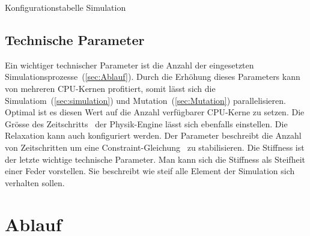     \begin{table}[H]
      
      \caption{Konfigurationstabelle Simulation\label{tbl:simulation-parameters-general}}
    \end{table}

    \subsection{Technische Parameter}
      Ein wichtiger technischer Parameter ist die Anzahl der eingesetzten Simulationsprozesse~(\vref{sec:Ablauf}).
      Durch die Erhöhung dieses Parameters kann von mehreren CPU-Kernen profitiert, somit lässt sich die Simulatiom~(\vref{sec:simulation}) und Mutation~(\vref{sec:Mutation}) parallelisieren.
      Optimal ist es diesen Wert auf die Anzahl verfügbarer CPU-Kerne zu setzen.
      Die Grösse des Zeitschritts~\cite{bullet:steppingTheWorld} der Physik-Engine lässt sich ebenfalls einstellen.
      Die Relaxation kann auch konfiguriert werden. Der Parameter beschreibt die Anzahl von Zeitschritten um eine Constraint-Gleichung~\cite{gamedev:constraints} zu stabilisieren.
      Die Stiffness ist der letzte wichtige technische Parameter. Man kann sich die Stiffness als Steifheit einer Feder vorstellen.
      Sie beschreibt wie steif alle Element der Simulation sich verhalten sollen.


  \section{Ablauf\label{sec:Ablauf}}

